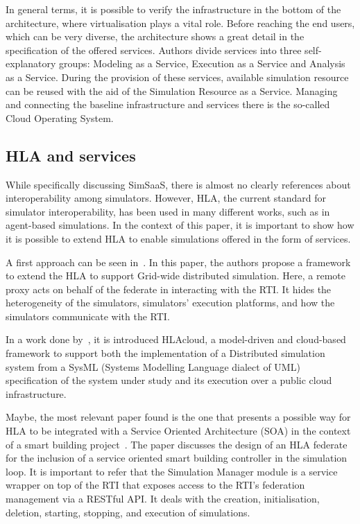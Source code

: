 \documentclass[conference]{IEEEtran}
\begin{document}
In general terms, it is possible to verify the infrastructure in the bottom of the architecture, where virtualisation plays a vital role. Before reaching the end users, which can be very diverse, the architecture shows a great detail in the specification of the offered services. Authors divide services into three self-explanatory groups: Modeling as a Service, Execution as a Service and Analysis as a Service. During the provision of these services, available simulation resource can be reused with the aid of the Simulation Resource as a Service. Managing and connecting the baseline infrastructure and services there is the so-called Cloud Operating System.

\subsection{HLA and services}
While specifically discussing SimSaaS, there is almost no clearly references about interoperability among simulators. However, HLA, the current standard for simulator interoperability, has been used in many different works, such as in agent-based simulations. In the context of this paper, it is important to show how it is possible to extend HLA to enable simulations offered in the form of services.

A first approach can be seen in~\cite{Xie:2005:SPH:1069810.1070184}. In this paper, the authors propose a framework to extend the HLA to support Grid-wide distributed simulation. Here, a remote proxy acts on behalf of the federate in interacting with the RTI. It hides the heterogeneity of the simulators, simulators' execution platforms, and how the simulators communicate with the RTI.

In a work done by~\cite{Bocciarelli:2013:SAF:2675983.2676156}, it is introduced HLAcloud, a model-driven and cloud-based framework to support both the implementation of a Distributed simulation system from a SysML (Systems Modelling Language dialect of UML) specification of the system under study and its execution over a public cloud infrastructure.

Maybe, the most relevant paper found is the one that presents a possible way for HLA to be integrated with a Service Oriented Architecture (SOA) in the context of a smart building project~\cite{Dragoicea:2012:IHS:2310096.2310200}. The paper discusses the design of an HLA federate for the inclusion of a service oriented smart building controller in the simulation loop. It is important to refer that the Simulation Manager module is a service wrapper on top of the RTI that exposes access to the RTI's federation management via a RESTful API. It deals with the creation, initialisation, deletion, starting, stopping, and execution of simulations.
\end{document}
